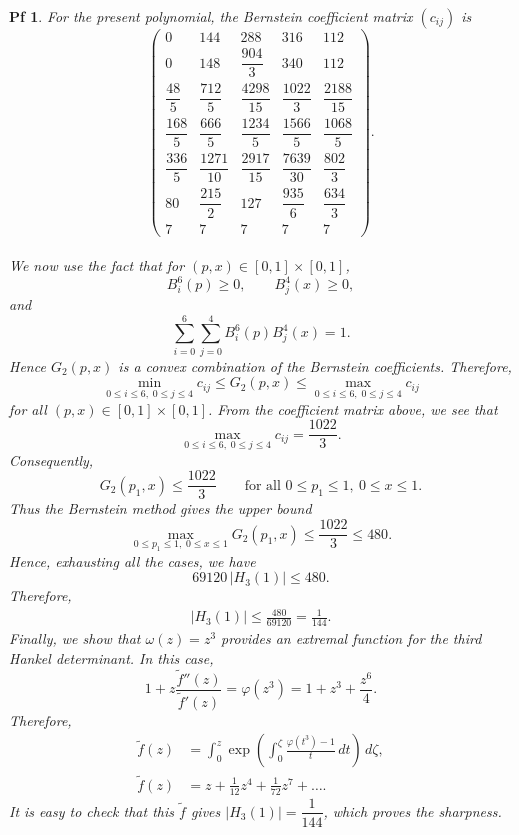 \documentclass[10pt,a4paper]{amsart}
\newtheorem{pf}{Pf}
\begin{document}
\begin{pf}
For the present polynomial, the Bernstein coefficient matrix \((c_{ij})\) is \\
\[
\begin{pmatrix}
0 & 144 & 288 & 316 & 112 \\[5mm]
0 & 148 & \dfrac{904}{3} & 340 & 112 \\[5mm]
\dfrac{48}{5} & \dfrac{712}{5} & \dfrac{4298}{15} & \dfrac{1022}{3} & \dfrac{2188}{15} \\[5mm]
\dfrac{168}{5} & \dfrac{666}{5} & \dfrac{1234}{5} & \dfrac{1566}{5} & \dfrac{1068}{5} \\[5mm]
\dfrac{336}{5} & \dfrac{1271}{10} & \dfrac{2917}{15} & \dfrac{7639}{30} & \dfrac{802}{3} \\[5mm]
80 & \dfrac{215}{2} & 127 & \dfrac{935}{6} & \dfrac{634}{3} \\[5mm]
7 & 7 & 7 & 7 & 7
\end{pmatrix}.
\]\\
We now use the fact that for \((p,x)\in[0, 1]\times[0, 1]\),
\[
B_i^6(p)\ge 0,\qquad B_j^4(x)\ge 0,
\]
and
\[
\sum_{i=0}^{6}\sum_{j=0}^{4} B_i^6(p)B_j^4(x)=1.
\]
Hence \(G_2(p,x)\) is a convex combination of the Bernstein coefficients. Therefore,
\[
\min_{0\le i\le 6,\;0\le j\le 4} c_{ij}
\le
G_2(p,x)
\le
\max_{0\le i\le 6,\;0\le j\le 4} c_{ij}
\]
for all $(p,x)\in[0, 1]\times[0, 1]$.
From the coefficient matrix above, we see that
\[
\max_{0\le i\le 6,\;0\le j\le 4} c_{ij}=\frac{1022}{3}.
\]
Consequently,
\[
G_2(p_1,x)\le \frac{1022}{3}
\qquad
\text{for all }0\le p_1\le 1,\ 0\le x\le 1.
\]
Thus the Bernstein method gives the upper bound
\[
\max_{0\le p_1\le 1,\;0\le x\le 1} G_2(p_1,x)\le \frac{1022}{3}\le 480.
\]
Hence, exhausting all the cases, we have
\[
69120\,|H_3(1)|\le 480.
\]
Therefore,
\begin{align*}
|H_3(1)|\le \frac{480}{69120}=\frac{1}{144}.
\end{align*}
Finally, we show that $\omega(z)=z^3$ provides an extremal function for the third Hankel determinant. In this case,
\[
1+z\frac{\widetilde{f}''(z)}{\widetilde{f}'(z)}=\varphi(z^3)
=1+z^3+\frac{z^6}{4}.
\]
Therefore,
\begin{align*}
\widetilde{f}(z)
&=\int_{0}^{z} \exp\!\left(\int_{0}^{\zeta} \frac{\varphi(t^3)-1}{t}\,dt\right)\, d\zeta,\\[2pt]
\widetilde{f}(z)
&=z + \frac{1}{12}z^4 + \frac{1}{72} z^7+\ldots .
\end{align*}
It is easy to check that this $\widetilde{f}$ gives $|H_3(1)|=\dfrac{1}{144}$, which proves the sharpness.
\end{pf}
\end{document}
